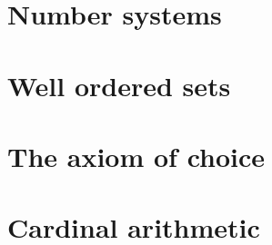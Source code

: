\documentclass{article}
\begin{document}
\begin{multicols}{2}
    
    
    
    
    
    \noindent\section{Number systems}
    
    
    
    
    
    \noindent\section{Well ordered sets}
    
    
    
    
    \noindent\section{The axiom of choice}
    
    
    
    
    \noindent\section{Cardinal arithmetic}
    
    
    
    
  \end{multicols}
\end{document}
